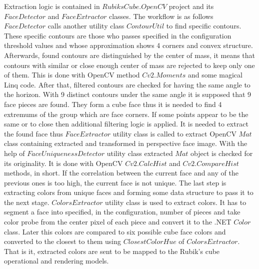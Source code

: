 \documentclass[../../main.tex]{subfiles}
\begin{document}
Extraction logic is contained in $RubiksCube.OpenCV$ project and its $FaceDetector$ and $FaceExtractor$ classes. The workflow is as follows $FaceDetector$ calls another utility class $ContourUtil$ to find specific contours. These specific contours are those who passes specified in the configuration threshold values and whose approximation shows 4 corners and convex structure. Afterwards, found contours are distinguished by the center of mass, it means that contours with similar or close enough center of mass are rejected to keep only one of them. This is done with \ac{OpenCV} method $Cv2.Moments$ and some magical {\Csharp} \ac{Linq} code. After that, filtered contours are checked for having the same angle to the horizon. With 9 distinct contours under the same angle it is supposed that 9 face pieces are found. They form a cube face thus it is needed to find 4 extremums of the group which are face corners. If some points appear to be the same or to close then additional filtering logic is applied. It is needed to extract the found face thus $FaceExtractor$ utility class is called to extract \ac{OpenCV} $Mat$ class containing extracted and transformed in perspective face image. With the help of $FaceUniquenessDetector$ utility class extracted $Mat$ object is checked for its originality. It is done with \ac{OpenCV} $Cv2.CalcHist$ and $Cv2.CompareHist$ methods, in short. If the correlation between the current face and any of the previous ones is too high, the current face is not unique. The last step is extracting colors from unique faces and forming some data structure to pass it to the next stage. $ColorsExtractor$ utility class is used to extract colors. It has to segment a face into specified, in the configuration, number of pieces and take color probe from the center pixel of each piece and convert it to the .NET $Color$ class. Later this colors are compared to six possible cube face colors and converted to the closest to them using $ClosestColorHue$ of $ColorsExtractor$. That is it, extracted colors are sent to be mapped to the Rubik's cube operational and rendering models.
\end{document}

